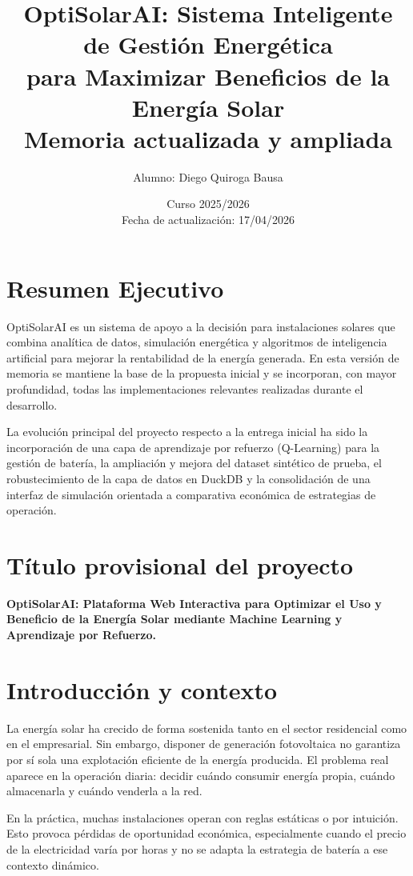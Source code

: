 \documentclass[12pt,a4paper]{article}
\title{OptiSolarAI: Sistema Inteligente de Gesti\'on Energ\'etica\\
para Maximizar Beneficios de la Energ\'ia Solar\\
\large Memoria actualizada y ampliada}
\author{Alumno: Diego Quiroga Bausa}
\date{Curso 2025/2026 \\ Fecha de actualizaci\'on: 17/04/2026}
\begin{document}
\maketitle
\tableofcontents
\newpage

\section*{Resumen Ejecutivo}
OptiSolarAI es un sistema de apoyo a la decisi\'on para instalaciones solares que combina anal\'itica de datos, simulaci\'on energ\'etica y algoritmos de inteligencia artificial para mejorar la rentabilidad de la energ\'ia generada. En esta versi\'on de memoria se mantiene la base de la propuesta inicial y se incorporan, con mayor profundidad, todas las implementaciones relevantes realizadas durante el desarrollo.

La evoluci\'on principal del proyecto respecto a la entrega inicial ha sido la incorporaci\'on de una capa de aprendizaje por refuerzo (Q-Learning) para la gesti\'on de bater\'ia, la ampliaci\'on y mejora del dataset sint\'etico de prueba, el robustecimiento de la capa de datos en DuckDB y la consolidaci\'on de una interfaz de simulaci\'on orientada a comparativa econ\'omica de estrategias de operaci\'on.

\newpage

\section{T\'itulo provisional del proyecto}
\textbf{OptiSolarAI: Plataforma Web Interactiva para Optimizar el Uso y Beneficio de la Energ\'ia Solar mediante Machine Learning y Aprendizaje por Refuerzo.}

\section{Introducci\'on y contexto}
La energ\'ia solar ha crecido de forma sostenida tanto en el sector residencial como en el empresarial. Sin embargo, disponer de generaci\'on fotovoltaica no garantiza por s\'i sola una explotaci\'on eficiente de la energ\'ia producida. El problema real aparece en la operaci\'on diaria: decidir cu\'ando consumir energ\'ia propia, cu\'ando almacenarla y cu\'ando venderla a la red.

En la pr\'actica, muchas instalaciones operan con reglas est\'aticas o por intuici\'on. Esto provoca p\'erdidas de oportunidad econ\'omica, especialmente cuando el precio de la electricidad var\'ia por horas y no se adapta la estrategia de bater\'ia a ese contexto din\'amico.
\end{document}

